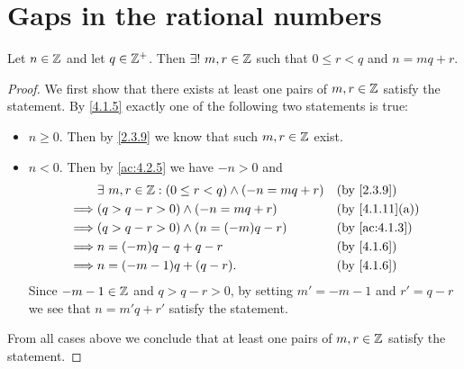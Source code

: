 \section{Gaps in the rational numbers}\label{sec:4.4}

\begin{ac}\label{ac:4.4.1}
  Let \(n \in \mathbb{Z}\) and let \(q \in \mathbb{Z}^+\).
  Then \(\exists!\ m, r \in \mathbb{Z}\) such that \(0 \leq r < q\) and \(n = mq + r\).
\end{ac}

\begin{proof}
  We first show that there exists at least one pairs of \(m, r \in \mathbb{Z}\) satisfy the statement.
  By \cref{4.1.5} exactly one of the following two statements is true:
  \begin{itemize}
    \item \(n \geq 0\).
          Then by \cref{2.3.9} we know that such \(m, r \in \mathbb{Z}\) exist.
    \item \(n < 0\).
          Then by \cref{ac:4.2.5} we have \(-n > 0\) and
          \begin{align*}
                     & \exists\ m, r \in \Z : (0 \leq r < q) \land (-n = mq + r) &  & \text{(by \cref{2.3.9})}     \\
            \implies & (q > q - r > 0) \land (-n = mq + r)                       &  & \text{(by \cref{4.1.11}(a))} \\
            \implies & (q > q - r > 0) \land (n = (-m)q - r)                     &  & \text{(by \cref{ac:4.1.3})}  \\
            \implies & n = (-m)q - q + q - r                                     &  & \text{(by \cref{4.1.6})}     \\
            \implies & n = (-m - 1)q + (q - r).                                  &  & \text{(by \cref{4.1.6})}
          \end{align*}
          Since \(-m - 1 \in \mathbb{Z}\) and \(q > q - r > 0\), by setting \(m' = -m - 1\) and \(r' = q - r\) we see that \(n = m'q + r'\) satisfy the statement.
  \end{itemize}
  From all cases above we conclude that at least one pairs of \(m, r \in \mathbb{Z}\) satisfy the statement.


\end{proof}
